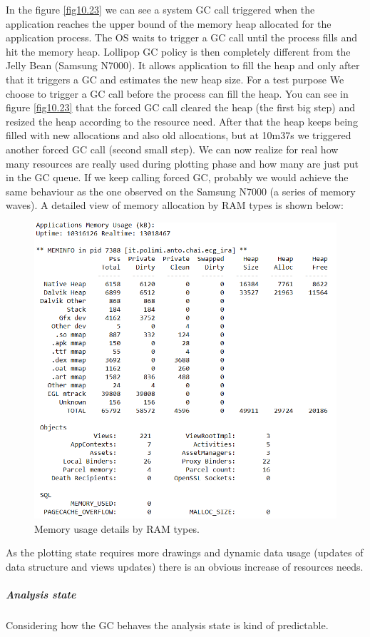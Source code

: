 In the figure \ref{fig10.23} we can see a system GC call triggered when the application reaches the upper bound of the memory heap allocated for the application process. The OS waits to trigger a GC call until the process fills and hit the memory heap. Lollipop GC policy is then completely different from the Jelly Bean (Samsung N7000). It allows application to fill the heap and only after that it triggers a GC and estimates the new heap size. For a test purpose We choose to trigger a GC call before the process can fill the heap. You can see in figure \ref{fig10.23} that the forced GC call cleared the heap (the first big step) and resized the heap according to the resource need. After that the heap keeps being filled with new allocations and also old allocations, but at 10m37s we triggered another forced GC call (second small step). We can now realize for real how many resources are really used during plotting phase and how many are just put in the GC queue. If we keep calling forced GC, probably we would achieve the same behaviour as the one observed on the Samsung N7000 (a series of memory waves).
\newpage
A detailed view of memory allocation by RAM types is shown below:
\begin{figure}[h!]
	\centering	
	\includegraphics[width=0.6\linewidth]{figures/ch10/24.png}
	\caption{ Memory usage details by RAM types.}  
	\label{fig10.24}
\end{figure}
As the plotting state requires more drawings and dynamic data usage (updates of data structure and views updates) there is an obvious increase of resources needs.
\subparagraph{Analysis state}
Considering how the GC behaves the analysis state is kind of predictable.
